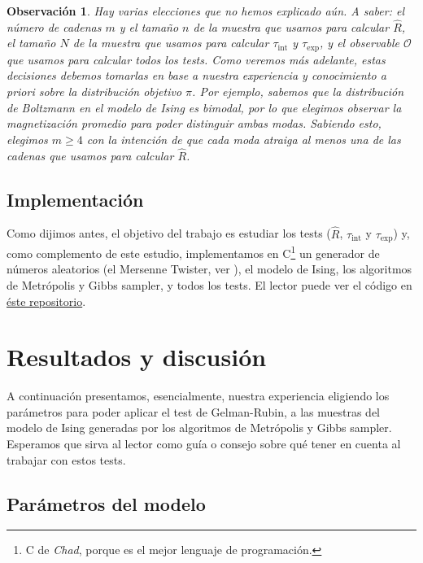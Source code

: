 \documentclass[a4paper, 12pt]{article}
\newtheorem*{observacion}{Observación}
\newcommand{\tauint}{\tau_\text{int}}
\newcommand{\tauexp}{\tau_\text{exp}}
\begin{document}
\begin{observacion}
    Hay varias elecciones que no hemos explicado aún. A saber: el número de cadenas $m$ y el tamaño $n$ de la muestra que usamos para calcular $\hat{R}$, el tamaño $N$ de la muestra que usamos para calcular $\tauint$ y $\tauexp$, y el observable $\mathcal{O}$ que usamos para calcular todos los tests. Como veremos más adelante, estas decisiones debemos tomarlas en base a nuestra experiencia y conocimiento a priori sobre la distribución objetivo $\pi$. Por ejemplo, sabemos que la distribución de Boltzmann en el modelo de Ising es bimodal, por lo que elegimos observar la magnetización promedio para poder distinguir ambas modas. Sabiendo esto, elegimos $m \geq 4$ con la intención de que cada moda atraiga al menos una de las cadenas que usamos para calcular $\hat{R}$.
\end{observacion}

\subsection{Implementación}

Como dijimos antes, el objetivo del trabajo es estudiar los tests ($\hat{R}$, $\tauint$ y $\tauexp$) y, como complemento de este estudio, implementamos en C\footnote{C de {\it Chad}, porque es el mejor lenguaje de programación.} un generador de números aleatorios (el Mersenne Twister, ver \cite{matsumoto1998mersenne}), el modelo de Ising, los algoritmos de Metrópolis y Gibbs sampler, y todos los tests. El lector puede ver el código en \href{https://github.com/santigiordani/fiscomp-final.git}{éste repositorio}.

\section{Resultados y discusión}

A continuación presentamos, esencialmente, nuestra experiencia eligiendo los parámetros para poder aplicar el test de Gelman-Rubin, a las muestras del modelo de Ising generadas por los algoritmos de Metrópolis y Gibbs sampler. Esperamos que sirva al lector como guía o consejo sobre qué tener en cuenta al trabajar con estos tests.

\subsection{Parámetros del modelo}
\end{document}

